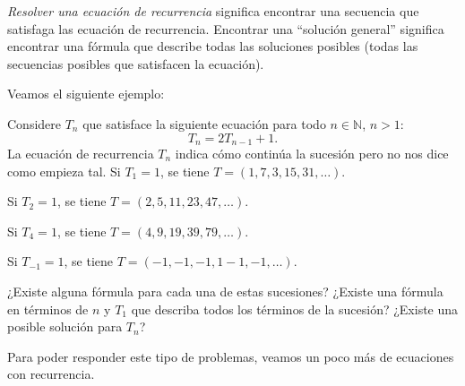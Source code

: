 \textit{Resolver una ecuación de recurrencia} significa encontrar una secuencia que satisfaga las ecuación de recurrencia. Encontrar una ``solución general'' significa encontrar una fórmula que describe todas las soluciones posibles (todas las secuencias posibles que satisfacen la ecuación).

Veamos el siguiente ejemplo:

Considere $T_{n}$ que satisface la siguiente ecuación para todo $n\in\mathds{N}$, $n>1$:
\begin{equation*}
	T_{n}=2T_{n-1}+1.
\end{equation*}
La ecuación de recurrencia $T_{n}$ indica cómo continúa la sucesión pero no nos dice como empieza tal.
Si $T_{1}=1$, se tiene $T=\left(1,7,3,15,31,\ldots\right)$.

Si $T_{2}=1$, se tiene $T=\left(2,5,11,23,47,\ldots\right)$.

Si $T_{4}=1$, se tiene $T=\left(4,9,19,39,79,\ldots\right)$.

Si $T_{-1}=1$, se tiene $T=\left(-1,-1,-1,1-1,-1,\ldots\right)$.

¿Existe alguna fórmula para cada una de estas sucesiones? ¿Existe una fórmula en términos de $n$ y $T_{1}$ que describa todos los términos de la sucesión? ¿Existe una posible solución para $T_{n}$?

Para poder responder este tipo de problemas, veamos un poco más de ecuaciones con recurrencia.


